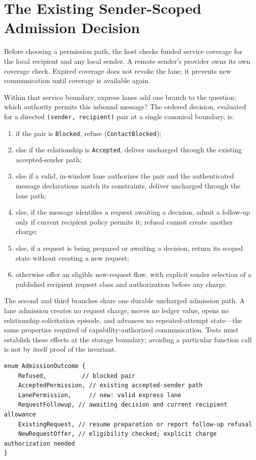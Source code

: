 \documentclass[11pt]{article}
\begin{document}
\section{The Existing Sender-Scoped Admission Decision}

Before choosing a permission path, the host checks funded service coverage for
the local recipient and any local sender. A remote sender's provider owns its
own coverage check. Expired coverage does not revoke the lane; it prevents new
communication until coverage is available again.

Within that service boundary, express lanes add one branch to the question:
which authority permits this inbound message? The ordered decision, evaluated for a
directed \texttt{(sender, recipient)} pair at a single canonical boundary, is:

\begin{enumerate}[leftmargin=2em]
    \item if the pair is \texttt{Blocked}, refuse (\texttt{ContactBlocked});
    \item else if the relationship is \texttt{Accepted}, deliver uncharged through
    the existing accepted-sender path;
    \item else if a valid, in-window lane authorizes the pair and the authenticated
    message declarations match its constraints, deliver uncharged through the lane
    path;
    \item else, if the message identifies a request awaiting a decision, admit a follow-up only
    if current recipient policy permits it; refusal cannot create another charge;
    \item else, if a request is being prepared or awaiting a decision, return its scoped
    state without creating a new request;
    \item otherwise offer an eligible new-request flow, with explicit sender
    selection of a published recipient request class and authorization before any charge.
\end{enumerate}

The second and third branches share one durable uncharged admission path. A lane
admission creates no request charge, moves no ledger value, opens no
relationship solicitation episode, and advances no repeated-attempt state---the
same properties required of capability-authorized communication. Tests must
establish these effects at the storage boundary; avoiding a particular function
call is not by itself proof of the invariant.

\begin{verbatim}
enum AdmissionOutcome {
    Refused,          // blocked pair
    AcceptedPermission, // existing accepted-sender path
    LanePermission,     // new: valid express lane
    RequestFollowup, // awaiting decision and current recipient allowance
    ExistingRequest, // resume preparation or report follow-up refusal
    NewRequestOffer, // eligibility checked; explicit charge authorization needed
}
\end{verbatim}
\end{document}
